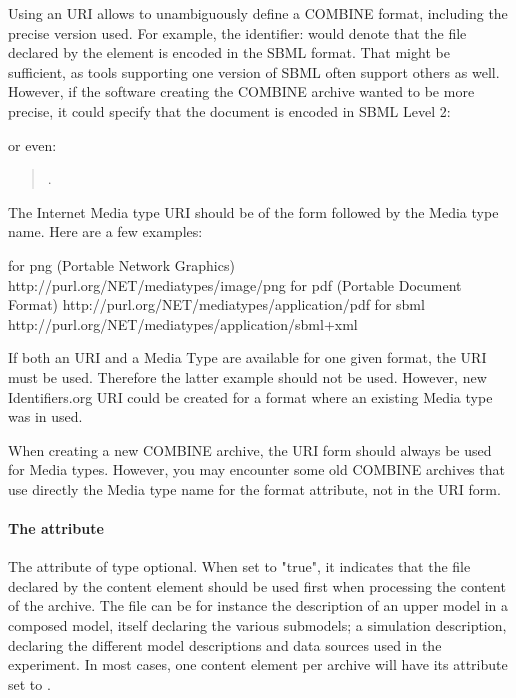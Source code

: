 Using an  URI allows to unambiguously define a COMBINE format, including the precise version used. For example, the identifier:  would denote that the file declared by the \Content 
element is encoded in the SBML format. That might be sufficient, as tools supporting one version of SBML often
support others as well. However, if the software creating the COMBINE archive wanted to be more precise, it could specify that the document is encoded in SBML Level 2: 

\begin{quote}
\end{quote}

or even:

\begin{quote}
.
\end{quote}


The Internet Media type  URI should be of the form 
followed by the Media type name. Here are a few examples:

\begin{example}
    for png (Portable Network Graphics) http://purl.org/NET/mediatypes/image/png
    for pdf (Portable Document Format) http://purl.org/NET/mediatypes/application/pdf
    for sbml http://purl.org/NET/mediatypes/application/sbml+xml
\end{example}

If both an  URI and a Media Type are available for one given format, the
 URI must be used. Therefore the latter example should not be used. However, new Identifiers.org URI could be created for a format where an existing Media type was in used.

When creating a new COMBINE archive, the URI form should always be used for Media types. However, you may encounter some
old COMBINE archives that use directly the Media type name for the format attribute, not in the URI form.

\paragraph{The  attribute}
\label{active_document}
The  attribute of type  optional. When set to "true", it 
indicates that the file declared by the content element should be used first when 
processing the content of the archive. The file can be for instance the description of an upper model in a 
composed model, itself declaring the various submodels; a simulation description, 
declaring the different model descriptions and data sources used in the 
experiment. In most cases, one content element per archive will have its  
attribute set to .

